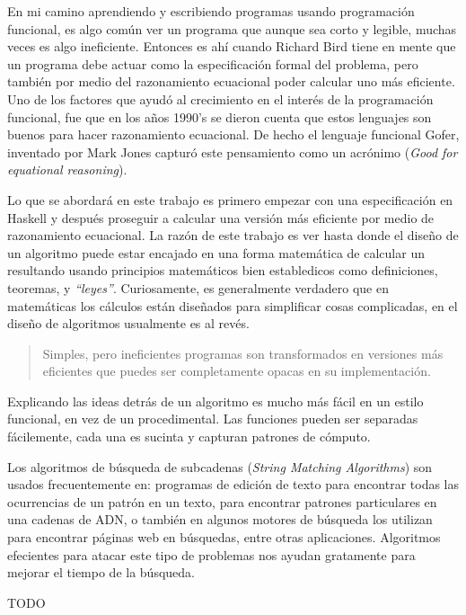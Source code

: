 En mi camino aprendiendo y escribiendo programas usando programación funcional, es algo común ver un programa
que aunque sea corto y legible, muchas veces es algo ineficiente. Entonces es ahí cuando Richard Bird tiene
en mente que un programa debe actuar como la especificación formal del problema, pero también por medio del
razonamiento ecuacional poder calcular uno más eficiente.
Uno de los factores que ayudó al crecimiento en el interés de la programación funcional, fue que en los años
1990's se dieron cuenta que estos lenguajes son buenos para hacer razonamiento ecuacional.
De hecho el lenguaje funcional Gofer, inventado por Mark Jones capturó este pensamiento como un acrónimo 
(\textit{Good for equational reasoning}).
\newline

Lo que se abordará en este trabajo es primero empezar con una especificación en Haskell y después proseguir a
calcular una versión más eficiente por medio de razonamiento ecuacional.
La razón de este trabajo es ver hasta donde el diseño de un algoritmo puede estar encajado en una forma
matemática de calcular un resultando usando principios matemáticos bien establedicos como definiciones, 
teoremas, y \textit{``leyes''}.
Curiosamente, es generalmente verdadero que en matemáticas los cálculos están diseñados para simplificar
cosas complicadas, en el diseño de algoritmos usualmente es al revés.
\begin{quote}
Simples, pero ineficientes programas son transformados en versiones más eficientes que puedes ser
completamente opacas en su implementación.
\end{quote}
Explicando las ideas detrás de un algoritmo es mucho más fácil en un estilo funcional, en vez de un
procedimental. Las funciones pueden ser separadas fácilemente, cada una es sucinta y capturan patrones
de cómputo.
\newline

Los algoritmos de búsqueda de subcadenas (\textit{String Matching Algorithms}) son usados frecuentemente en:
programas de edición de texto para encontrar todas las ocurrencias de un patrón en un texto, para encontrar
patrones particulares en una cadenas de ADN, o también en algunos motores de búsqueda los utilizan para
encontrar páginas web en búsquedas, entre otras aplicaciones. Algoritmos efecientes para atacar este tipo de
problemas nos ayudan gratamente para mejorar el tiempo de la búsqueda.
\newline

TODO

